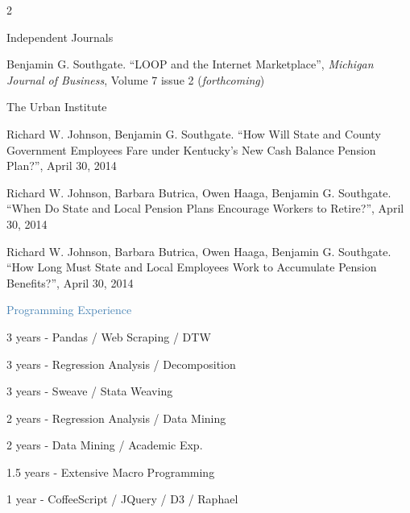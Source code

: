 \documentclass{article}
\newcommand{\entry}[4][1]{
  \vspace{0.5em}
  \parbox{.75\linewidth}{\large #2 \hfill}%
  \parbox{.25\linewidth}{\hfill \textit{\small #3}}\ifthenelse{\equal{#1}{1}}{}{

    \vspace{5pt}
    #1

  }
  \begin{description}[style=multiline,leftmargin=.8cm,itemsep=1pt]
    \small
    #4
  \end{description}
}
\newcommand{\s}[2]{
  \vspace{2em}
  {
    \textcolor{steelblue}{\LARGE #1}
  
    \hrulefill
  }
  #2
}
\newcommand\bx[0]{$\quad \scriptscriptstyle \color{steelblue} \blacksquare$}
\begin{document}
\begin{multicols}{2}
{      \entry{Independent Journals}{}{
        \item[\bx] Benjamin G. Southgate. ``LOOP and the Internet Marketplace'', \textit{Michigan Journal of Business}, Volume 7 issue 2 (\textit{forthcoming})
      }
      \entry{The Urban Institute}{}{
        \item[\bx] Richard W. Johnson, Benjamin G. Southgate. ``How Will State and County Government Employees Fare under Kentucky's New Cash Balance Pension Plan?'', April 30, 2014

        \item[\bx] Richard W. Johnson, Barbara Butrica, Owen Haaga, Benjamin G. Southgate. ``When Do State and Local Pension Plans Encourage Workers to Retire?'', April 30, 2014

        \item[\bx] Richard W. Johnson, Barbara Butrica, Owen Haaga, Benjamin G. Southgate. ``How Long Must State and Local Employees Work to Accumulate Pension Benefits?'', April 30, 2014
      }

    } 
    \s{Programming Experience}{
      \begin{description}[style=multiline,leftmargin=1.7cm,itemsep=1pt]
        \small
        \item [Python] 3 years -  Pandas / Web Scraping / DTW
        \item [Stata] 3 years - Regression Analysis / Decomposition
        \item [\LaTeX] 3 years - Sweave / Stata Weaving
        \item [R] 2 years - Regression Analysis / Data Mining
        \item [Java] 2 years - Data Mining / Academic Exp.
        \item [SAS] 1.5 years - Extensive Macro Programming
        \item [JavaScript] 1 year - CoffeeScript / JQuery / D3 / Raphael 
      \end{description}
    }
  \end{multicols}
\end{document}
